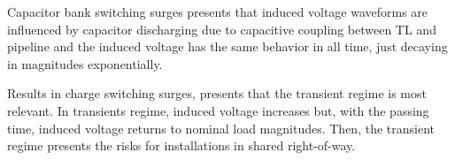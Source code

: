 \documentclass[5p,twocolumn]{elsarticle}
\begin{document}
Capacitor bank switching surges presents that induced voltage waveforms are influenced by capacitor discharging due to capacitive coupling between TL and pipeline and the induced voltage has the same behavior in all time, just decaying in magnitudes exponentially.

Results in charge switching surges, presents that the transient regime is most relevant. In transients regime, induced voltage increases but, with the passing time, induced voltage returns to nominal load magnitudes. Then, the transient regime presents the risks for installations in shared right-of-way.



\end{document}
